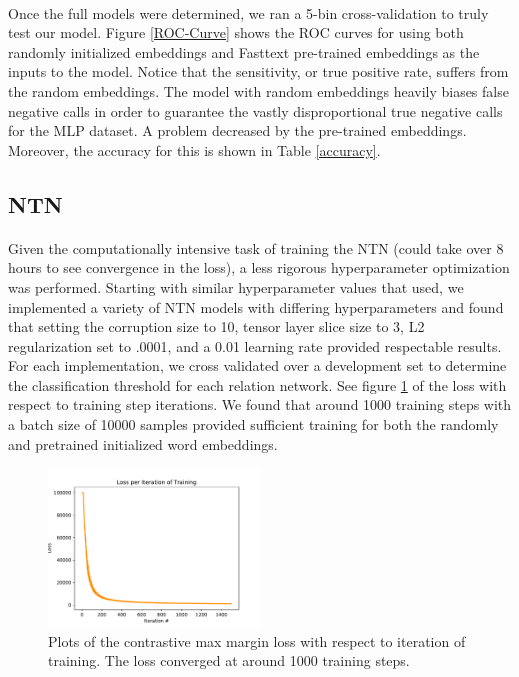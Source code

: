 \documentclass[11.5pt]{article}
\newcounter{Figure}
\newcounter{graphics}
\begin{document}
 
 \paragraph{} Once the full models were determined, we ran a 5-bin cross-validation to truly test our model. Figure \ref{ROC-Curve} shows the ROC curves for using both randomly initialized embeddings and Fasttext pre-trained embeddings as the inputs to the model. Notice that the sensitivity, or true positive rate, suffers from the random embeddings. The model with random embeddings heavily biases false negative calls in order to guarantee the vastly disproportional true negative calls for the MLP dataset. A problem decreased by the pre-trained embeddings. Moreover, the accuracy for this is shown in Table \ref{accuracy}.  
 

 
\subsection{NTN}
\paragraph{} Given the computationally intensive task of training the NTN (could take over 8 hours to see convergence in the loss), a less rigorous hyperparameter optimization was performed. Starting with similar hyperparameter values that  \cite{socher2013reasoning} used, we implemented a variety of NTN models with differing hyperparameters and found that setting the corruption size to 10, tensor layer slice size to 3, L2 regularization set to .0001, and a 0.01 learning rate provided respectable results. For each implementation, we cross validated over a development set to determine the classification threshold for each relation network. See figure \ref{_loss_.pdf} of the loss with respect to training step iterations. We found that around 1000 training steps with a batch size of 10000 samples provided sufficient training for both the randomly and pretrained initialized word embeddings.

 \begin{figure}[h!]
\centerline{\includegraphics[width=0.5\textwidth]{report_ntn/_loss_.pdf}}
  \caption{\small Plots of the contrastive max margin loss with respect to iteration of training. The loss converged at around 1000 training steps. }
\label{_loss_.pdf}
\end{figure}
\end{document}
